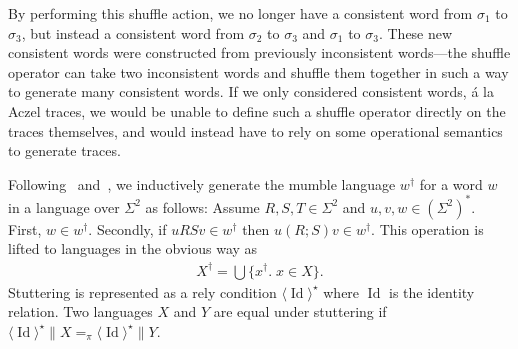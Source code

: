 \documentclass{llncs}
\DeclareMathOperator{\Id}{Id}
\begin{document}
\begin{center}
\end{center}

By performing this shuffle action, we no longer have a consistent word
from $\sigma_1$ to $\sigma_3$, but instead a consistent word from
$\sigma_2$ to $\sigma_3$ and $\sigma_1$ to $\sigma_3$. These new
consistent words were constructed from previously inconsistent
words---the shuffle operator can take two inconsistent words and
shuffle them together in such a way to generate many consistent
words. If we only considered consistent words, \'a la Aczel traces, we
would be unable to define such a shuffle operator directly on the
traces themselves, and would instead have to rely on some operational
semantics to generate traces.

Following~\cite{brookes_full_1993} and~\cite{dingel_refinement_2002},
we inductively generate the mumble language $w^\dagger$ for a word $w$
in a language over $\Sigma^2$ as follows: Assume $R,S,T \in \Sigma^2$
and $u,v,w \in (\Sigma^2)^*$. First, $w \in w^\dagger$. Secondly, if
$uRSv \in w^\dagger$ then $u(R;S)v \in w^\dagger$. This operation is
lifted to languages in the obvious way as
\begin{align*}
X^\dagger = \bigcup\{x^\dagger.\; x \in X\}.
\end{align*}
Stuttering is represented as a rely condition $\langle \Id\rangle^\star$
where $\Id$ is the identity relation. Two languages $X$ and $Y$ are
equal under stuttering if $\langle \Id\rangle^\star \| X =_\pi \langle
\Id\rangle^\star \| Y$.
\end{document}
